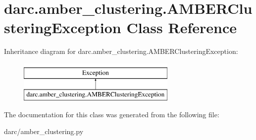 \hypertarget{classdarc_1_1amber__clustering_1_1_a_m_b_e_r_clustering_exception}{}\section{darc.\+amber\+\_\+clustering.\+A\+M\+B\+E\+R\+Clustering\+Exception Class Reference}
\label{classdarc_1_1amber__clustering_1_1_a_m_b_e_r_clustering_exception}
Inheritance diagram for darc.\+amber\+\_\+clustering.\+A\+M\+B\+E\+R\+Clustering\+Exception\+:\begin{figure}[H]
\begin{center}
\leavevmode
\includegraphics[height=2.000000cm]{classdarc_1_1amber__clustering_1_1_a_m_b_e_r_clustering_exception}
\end{center}
\end{figure}


The documentation for this class was generated from the following file\+:\begin{DoxyCompactItemize}
\item 
darc/amber\+\_\+clustering.\+py\end{DoxyCompactItemize}
